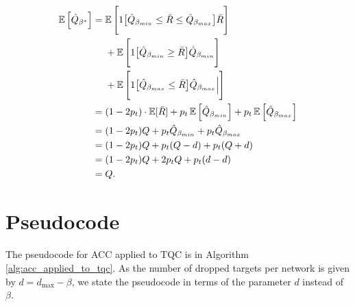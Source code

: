  
\begin{align*}
   \operatorname*{\mathbb{E}} \Big[ \hat{Q}_{\beta^*} \Big] 
   &= \operatorname*{\mathbb{E}} \Bigg[ 1\big[\hat{Q}_{\beta_{min}} \leq \Bar{R} \leq \hat{Q}_{\beta_{max}}\big] \Bar{R}  \Bigg]  \\
  &~~~~+  \operatorname*{\mathbb{E}} \Bigg[ 1\big[\hat{Q}_{\beta_{min}} \geq \Bar{R} \big]  \hat{Q}_{\beta_{min}} \Bigg] \\
  &~~~~+  \operatorname*{\mathbb{E}} \Bigg[ 1\big[\hat{Q}_{\beta_{max}} \leq \Bar{R} \big]  \hat{Q}_{\beta_{max}}  \Big| \Bigg]  \\
   &= (1-2p_t) \cdot \operatorname*{\mathbb{E}}[\Bar{R}] + p_t \operatorname*{\mathbb{E}}\Big[\hat{Q}_{\beta_{min}}\Big] + p_t \operatorname*{\mathbb{E}}\Big[\hat{Q}_{\beta_{max}}\Big] \\
   &= (1-2p_t) Q + p_t \hat{Q}_{\beta_{min}}+ p_t \hat{Q}_{\beta_{max}}\\
   &= (1-2p_t) Q + p_t (Q-d) + p_t (Q+d)\\
   &= (1-2p_t) Q + 2p_t Q + p_t(d-d) \\
   &= Q.
\end{align*}




\section{Pseudocode}
\label{app:pseudocode}


The pseudocode for ACC applied to TQC is in Algorithm \ref{alg:acc_applied_to_tqc}.
As the number of dropped targets per network is given by $d= d_{\max} - \beta $, we state the pseudocode in terms of the parameter $d$ instead of $\beta$. 


